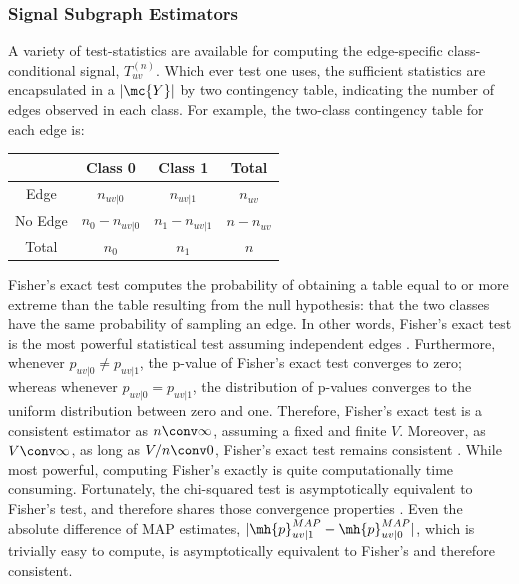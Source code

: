 \documentclass[10pt,journal,cspaper,compsoc]{IEEEtran}
\begin{document}
\subsubsection{Signal Subgraph Estimators} %
\label{ssub:subsubsection_name5}



A variety of test-statistics are available for computing the edge-specific class-conditional signal, $T_{uv}^{(n)}$. Which ever test one uses, the sufficient statistics are encapsulated in a $|\mc{Y}|$ by two contingency table, indicating the number of edges observed in each class.  For example, the two-class contingency table for each edge is:

\begin{table}[h!]
\begin{center}
\begin{tabular}{c||c|c||c}
 & Class 0  & Class 1 & Total \\
\hline\hline
Edge & $n_{uv|0}$ & $n_{uv|1}$ & $n_{uv}$ \\ \hline
No Edge & $n_0-n_{uv|0}$ & $n_1-n_{uv|1}$ & $n-n_{uv}$ \\ \hline \hline
Total & $n_0$ & $n_1$ & $n$\\
\end{tabular}
\end{center}
\label{tab:fwpath}
\end{table}%

Fisher's exact test computes the probability of obtaining a table equal to or more extreme than the table resulting from the null hypothesis: that the two classes have the same probability of sampling an edge.  In other words, Fisher's exact test is the most powerful statistical test assuming independent edges \cite{}.  Furthermore, whenever $p_{uv|0}\neq p_{uv|1}$, the p-value of Fisher's exact test converges to zero; whereas whenever $p_{uv|0}=p_{uv|1}$, the distribution of p-values converges to the uniform distribution between zero and one.  Therefore, Fisher's exact test is a consistent estimator as $n \conv \infty$, assuming a fixed and finite $V$.  Moreover, as $V \conv \infty$, as long as $V/n \conv 0$, Fisher's exact test remains consistent \cite{}.  While most powerful, computing Fisher's exactly is quite computationally time consuming.  Fortunately, the chi-squared test is asymptotically equivalent to Fisher's test, and therefore shares those convergence properties \cite{}.  Even the absolute difference of MAP estimates, $|\mh{p}_{uv|1}^{MAP}-\mh{p}_{uv|0}^{MAP}|$, which is trivially easy to compute, is asymptotically equivalent to Fisher's \cite{} and therefore consistent.
\end{document}
